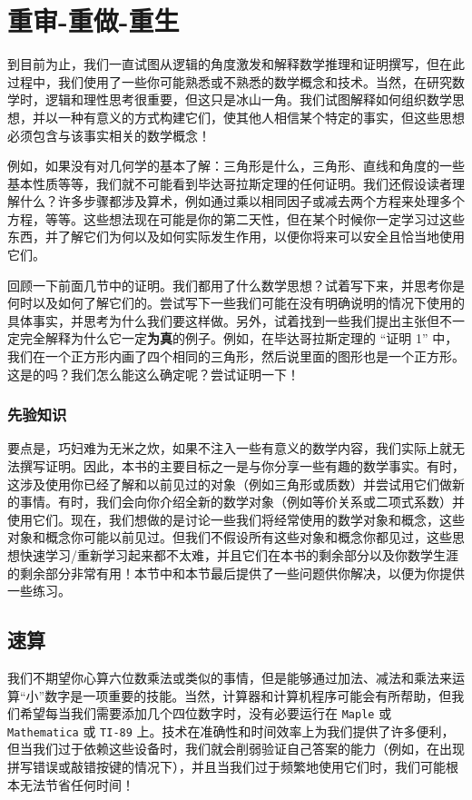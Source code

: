 \section{重审-重做-重生}\label{sec:section1.3}

到目前为止，我们一直试图从逻辑的角度激发和解释数学推理和证明撰写，但在此过程中，我们使用了一些你可能熟悉或不熟悉的数学概念和技术。当然，在研究数学时，逻辑和理性思考很重要，但这只是冰山一角。我们试图解释如何组织数学思想，并以一种有意义的方式构建它们，使其他人相信某个特定的事实，但这些思想必须包含与该事实相关的数学概念！

例如，如果没有对几何学的基本了解：三角形是什么，三角形、直线和角度的一些基本性质等等，我们就不可能看到毕达哥拉斯定理的任何证明。我们还假设读者理解什么？许多步骤都涉及算术，例如通过乘以相同因子或减去两个方程来处理多个方程，等等。这些想法现在可能是你的第二天性，但在某个时候你一定学习过这些东西，并了解它们为何以及如何实际发生作用，以便你将来可以安全且恰当地使用它们。

回顾一下前面几节中的证明。我们都用了什么数学思想？试着写下来，并思考你是何时以及如何了解它们的。尝试写下一些我们可能在没有明确说明的情况下使用的具体事实，并思考为什么我们要这样做。另外，试着找到一些我们提出主张但不一定完全解释为什么它一定\textbf{为真}的例子。例如，在毕达哥拉斯定理的 “证明 1” 中，我们在一个正方形内画了四个相同的三角形，然后说里面的图形也是一个正方形。这是的吗？我们怎么能这么确定呢？尝试证明一下！

\subsubsection*{先验知识}

要点是，巧妇难为无米之炊，如果不注入一些有意义的数学内容，我们实际上就无法撰写证明。因此，本书的主要目标之一是与你分享一些有趣的数学事实。有时，这涉及使用你已经了解和以前见过的对象（例如三角形或质数）并尝试用它们做新的事情。有时，我们会向你介绍全新的数学对象（例如等价关系或二项式系数）并使用它们。现在，我们想做的是讨论一些我们将经常使用的数学对象和概念，这些对象和概念你可能以前见过。但我们不假设所有这些对象和概念你都见过，这些思想快速学习/重新学习起来都不太难，并且它们在本书的剩余部分以及你数学生涯的剩余部分非常有用！本节中和本节最后提供了一些问题供你解决，以便为你提供一些练习。

\subsection{速算}

我们不期望你心算六位数乘法或类似的事情，但是能够通过加法、减法和乘法来运算“小”数字是一项重要的技能。当然，计算器和计算机程序可能会有所帮助，但我们希望每当我们需要添加几个四位数字时，没有必要运行在 \verb|Maple| 或 \verb|Mathematica| 或 \verb|TI-89| 上。技术在准确性和时间效率上为我们提供了许多便利，但当我们过于依赖这些设备时，我们就会削弱验证自己答案的能力（例如，在出现拼写错误或敲错按键的情况下），并且当我们过于频繁地使用它们时，我们可能根本无法节省任何时间！

